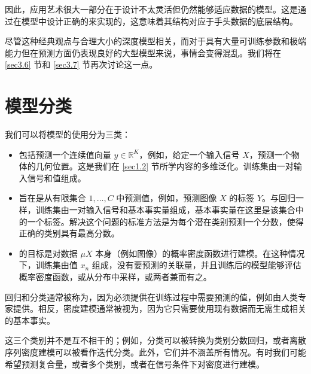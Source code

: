 因此，应用艺术很大一部分在于设计不太灵活但仍然能够适应数据的模型。这是通过在模型中设计正确的来实现的，这意味着其结构对应于手头数据的底层结构。

尽管这种经典观点与合理大小的深度模型相关，而对于具有大量可训练参数和极端能力但在预测方面仍表现良好的大型模型来说，事情会变得混乱。我们将在 \ref{sec3.6} 节和 \ref{sec3.7} 节再次讨论这一点。

\section{模型分类}\label{sec1.4}

我们可以将模型的使用分为三类：

\begin{itemize}
    \item {}包括预测一个连续值向量 $y \in \mathbb{R}^K$，例如，给定一个输入信号 $X$，预测一个物体的几何位置。这是我们在 \ref{sec1.2} 节所学内容的多维泛化。训练集由一对输入信号和值组成。
    \item {}旨在是从有限集合 ${1,\dots,C}$ 中预测值，例如，预测图像 $X$ 的标签 $Y$。与回归一样，训练集由一对输入信号和基本事实量组成，基本事实量在这里是该集合中的一个标签。解决这个问题的标准方法是为每个潜在类别预测一个分数，使得正确的类别具有最高分数。
    \item {}的目标是对数据 $\mu X$ 本身（例如图像）的概率密度函数进行建模。在这种情况下，训练集由值 $x_n$ 组成，没有要预测的关联量，并且训练后的模型能够评估概率密度函数，或从分布中采样，或两者兼而有之。
\end{itemize}

回归和分类通常被称为，因为必须提供在训练过程中需要预测的值，例如由人类专家提供。相反，密度建模通常被视为，因为它只需要使用现有数据而无需生成相关的基本事实。

这三个类别并不是互不相干的；例如，分类可以被转换为类别分数回归，或者离散序列密度建模可以被看作迭代分类。此外，它们并不涵盖所有情况。有时我们可能希望预测复合量，或者多个类别，或者在信号条件下对密度进行建模。